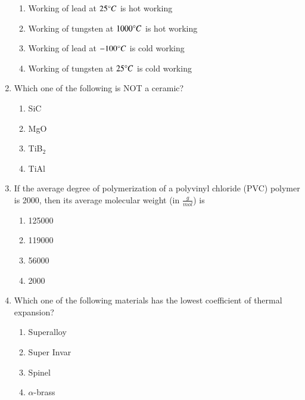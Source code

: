 \documentclass[journal]{IEEEtran}
\begin{document}
\begin{enumerate}
            \begin{enumerate}
                \item Working of lead at $25\degree C$ is hot working
                \item Working of tungsten at $1000\degree C$ is hot working
                \item Working of lead at $-100\degree C$ is cold working
                \item Working of tungsten at $25\degree C$ is cold working
            \end{enumerate}

		
    \item Which one of the following is NOT a ceramic?

        \begin{multicols}{4}
            \begin{enumerate}
                \item SiC
                \item MgO
                \item TiB$_2$
                \item TiAl
            \end{enumerate}
        \end{multicols}

    \item If the average degree of polymerization of a polyvinyl chloride (PVC) polymer is 2000, then its average molecular weight (in $\frac{g}{mol}$) is

        \begin{multicols}{4}
            \begin{enumerate}
                \item 125000
                \item 119000
                \item 56000
                \item 2000
            \end{enumerate}
        \end{multicols}

    \item Which one of the following materials has the lowest coefficient of thermal expansion?

        \begin{multicols}{4}
            \begin{enumerate}
                \item Superalloy
                \item Super Invar
                \item Spinel
                \item $\alpha$-brass
            \end{enumerate}
        \end{multicols}
        

\end{enumerate}
\end{document}
